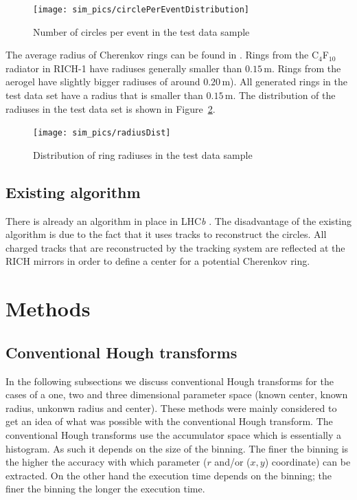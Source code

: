 \documentclass[11pt]{scrreprt}
\begin{document}
\begin{figure}[tb]
  \centering
  \texttt{[image: sim\_pics/circlePerEventDistribution]}
  \caption{Number of circles per event in the test data sample}
  \label{fig:circlePerEventDist}
\end{figure}

The average radius of Cherenkov rings can be found in \cite{Forty1999}. Rings from the C$_4$F$_{10}$ radiator in RICH-1 have radiuses generally smaller than $0.15$\,m. Rings from the aerogel have slightly bigger radiuses of around $0.20$\,m). All generated rings in the test data set have a radius that is smaller than $0.15$\,m. The distribution of the radiuses in the test data set is shown in Figure~\ref{fig:radius_dist}.

\begin{figure}[tb]
  \centering
  \texttt{[image: sim\_pics/radiusDist]}
  \caption{Distribution of ring radiuses in the test data sample}
  \label{fig:radius_dist}
\end{figure}

\section{Existing algorithm} %
\label{sub:existing_algorithm}
There is already an algorithm in place in LHC\textit{b} \cite{Forty1999}. The disadvantage of the existing algorithm is due to the 
fact that it uses tracks to reconstruct the circles. All charged tracks that are reconstructed by the tracking system are reflected at
the RICH mirrors in order to define a center for a potential Cherenkov ring.


\chapter{Methods}

\section{Conventional Hough transforms} %
\label{sec:conventional_hough_transforms}

In the following subsections we discuss  conventional Hough transforms for the cases of a one, two and three dimensional parameter space (known center, known radius, unkonwn radius and center). 
These methods were mainly considered to get an idea of what was possible with the conventional Hough transform.
The conventional Hough transforms use the accumulator space which is essentially a histogram. As such it depends on the size of the binning. The finer the binning is the higher the accuracy with which parameter ($r$ and/or ($x,y$) coordinate) can be extracted. On the other hand the execution time depends on the binning; the finer the binning the longer the execution time.
\end{document}
